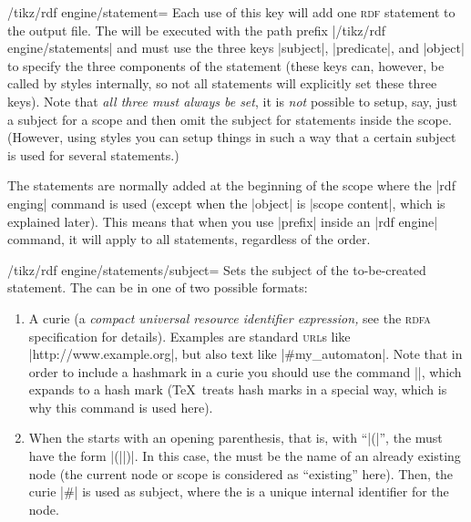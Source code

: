 \begin{key}{/tikz/rdf engine/statement=}
    Each use of this key will add one \textsc{rdf} statement to the output
    file. The  will be executed with the path prefix
    |/tikz/rdf engine/statements| and must use the three keys |subject|,
    |predicate|, and |object| to specify the three components of the statement
    (these keys can, however, be called by styles internally, so not all
    statements will explicitly set these three keys). Note that \emph{all three
    must always be set}, it is \emph{not} possible to setup, say, just a
    subject for a scope and then omit the subject for statements inside the
    scope. (However, using styles you can setup things in such a way that a
    certain subject is used for several statements.)
\begin{codeexample}
\end{codeexample}

    The statements are normally  added at the beginning of the scope where the
    |rdf enging| command is used (except when the |object| is |scope content|,
    which is explained later). This means that when you use |prefix| inside an
    |rdf engine| command, it will apply to all statements, regardless of the
    order.

    \begin{key}{/tikz/rdf engine/statements/subject=}
        Sets the subject of the to-be-created statement. The  can
        be in one of two possible formats:
        \begin{enumerate}
            \item A curie (a \emph{compact universal resource identifier
                expression,} see the \textsc{rdfa} specification for details).
                Examples are standard \textsc{url}s like
                |http://www.example.org|, but also text like |#my_automaton|.
                Note that in order to include a hashmark in a curie you should
                use the command |\tikzrdfhashmark|, which expands to a hash
                mark (\TeX\ treats hash marks in a special way, which is why
                this command is used here).
            \item When the  starts with an opening parenthesis,
                that is, with ``|(|'', the  must have the form
                |(||)|. In this case, the  must be the name of an already existing node
                (the current node or scope is considered as ``existing'' here).
                Then, the curie |#| is used as subject, where the
                 is a unique internal identifier for the node.


\end{enumerate}
\end{key}
\end{key}
